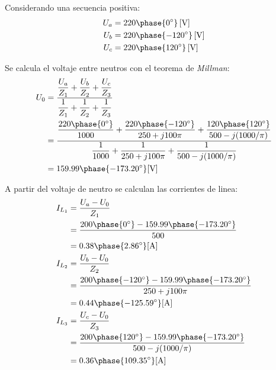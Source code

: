 \documentclass[letter,11pt]{article}
\begin{document}
Considerando una secuencia positiva:
\begin{equation*}
    \begin{split}
        U_a &= 220\phase{0^{\circ}}\,[\text{V}]\\
        U_b &= 220\phase{-120^{\circ}}\,[\text{V}]\\
        U_c &= 220\phase{120^{\circ}}\,[\text{V}]\\
    \end{split}
\end{equation*}

Se calcula el voltaje entre neutros con el teorema de \emph{Millman}:
\begin{equation*}
    \begin{split}
        U_0 &= \dfrac{
                   \dfrac{U_a}{Z_1}+\dfrac{U_b}{Z_2}+\dfrac{U_c}{Z_3}
               }{
                   \dfrac{1}{Z_1}+\dfrac{1}{Z_2}+\dfrac{1}{Z_3}
               }\\
            &= \dfrac{
                   \dfrac{220\phase{0^{\circ}}}{1000}+
                   \dfrac{220\phase{-120^{\circ}}}{250+j100\pi}+
                   \dfrac{120\phase{120^{\circ}}}{500-j(1000/\pi)}
               }{
                   \dfrac{1}{1000}+
                   \dfrac{1}{250+j100\pi}+
                   \dfrac{1}{500-j(1000/\pi)}
               }\\
            &= 159.99\phase{-173.20^{\circ}}[\text{V}]\\
    \end{split}
\end{equation*}

A partir del voltaje de neutro se calculan las corrientes de linea:
\begin{equation*}
    \begin{split}
        I_{L_1} &= \frac{U_a - U_0}{Z_1}\\
                &= \frac{200\phase{0^{\circ}}
                   -159.99\phase{-173.20^{\circ}}}{500}\\
                &= 0.38\phase{2.86^{\circ}}[\text{A}]\\
        I_{L_2} &= \frac{U_b - U_0}{Z_2}\\
                &= \frac{200\phase{-120^{\circ}}
                   -159.99\phase{-173.20^{\circ}}}{250+j100\pi}\\
                &= 0.44\phase{-125.59^{\circ}}[\text{A}]\\
        I_{L_3} &= \frac{U_c - U_0}{Z_3}\\
                &= \frac{200\phase{120^{\circ}}
                   -159.99\phase{-173.20^{\circ}}}{500-j(1000/\pi)}\\
                &= 0.36\phase{109.35^{\circ}}[\text{A}]\\
    \end{split}
\end{equation*}
\end{document}
